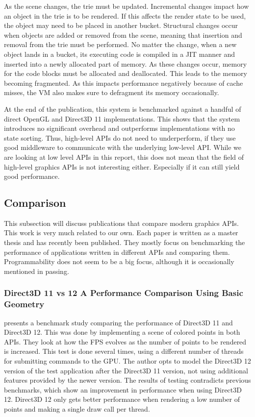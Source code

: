 As the scene changes, the trie must be updated.
Incremental changes impact how an object in the trie is to be rendered.
If this affects the render state to be used, the object may need to be placed in another bucket.
Structural changes occur when objects are added or removed from the scene, meaning that insertion and removal from the trie must be performed.
No matter the change, when a new object lands in a bucket, its executing code is compiled in a \gls{JIT} manner and inserted into a newly allocated part of memory.
As these changes occur, memory for the code blocks must be allocated and deallocated. 
This leads to the memory becoming fragmented.
As this impacts performance negatively because of cache misses, the \gls{VM} also makes sure to defragment its memory occasionally.

 
At the end of the publication, this system is benchmarked against a handful of direct OpenGL and Direct3D 11 implementations. 
This shows that the system introduces no significant overhead and outperforms implementations with no state sorting. 
Thus, high-level \glspl{API} do not need to underperform, if they use good middleware to communicate with the underlying low-level \gls{API}. 
While we are looking at low level \glspl{API} in this report, this does not mean that the field of high-level graphics \glspl{API} is not interesting either. 
Especially if it can still yield good performance.


\subsection{Comparison}
This subsection will discuss publications that compare modern graphics \glspl{API}.
This work is very much related to our own. Each paper is written as a master thesis and has recently been published.
They mostly focus on benchmarking the performance of applications written in different \glspl{API} and comparing them. 
Programmability does not seem to be a big focus, although it is occasionally mentioned in passing. 


\subsubsection{Direct3D 11 vs 12 A Performance Comparison Using Basic Geometry}
\citet{2016_direct3d} presents a benchmark study comparing the performance of Direct3D 11 and Direct3D 12.
This was done by implementing a scene of colored points in both \glspl{API}. 
They look at how the \gls{FPS} evolves as the number of points to be rendered is increased.
This test is done several times, using a different number of threads for submitting commands to the \gls{GPU}. 
The author opts to model the Direct3D 12 version of the test application after the Direct3D 11 version, not using additional features provided by the newer version. 
The results of testing contradicts previous benchmarks, which show an improvement in performance when using Direct3D 12.
Direct3D 12 only gets better performance when rendering a low number of points and making a single draw call per thread.


